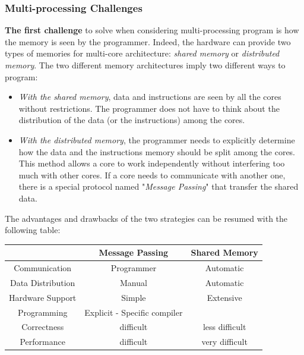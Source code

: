\documentclass[10pt,letterpaper]{article}
\begin{document}
\subsubsection{Multi-processing Challenges}

\textbf{The first challenge} to solve when considering multi-processing program is how the memory is seen by the programmer. Indeed, the hardware can provide two types of memories for multi-core architecture: \textit{shared memory} or \textit{distributed memory}. The two different memory architectures imply two different ways to program:\\
\begin{itemize}
    \item \textit{With the shared memory}, data and instructions are seen by all the cores without restrictions. The programmer does not have to think about the distribution of the data (or the instructions) among the cores.
    \item \textit{With the distributed memory}, the programmer needs to explicitly determine how the data and the instructions memory should be split among the cores. This method allows a core to work independently without interfering too much with other cores. If a core needs to communicate with another one, there is a special protocol named "\textit{Message Passing}" that transfer the shared data.
\end{itemize}

The advantages and drawbacks of the two strategies can be resumed with the following table:

\begin{center}
 \begin{tabular}{||c c c||} 
 \hline
  & Message Passing & Shared Memory \\ [0.5ex] 
 \hline\hline
 Communication & Programmer & Automatic \\ 
 \hline
 Data Distribution & Manual & Automatic \\
\hline
 Hardware Support & Simple & Extensive \\
\hline
 Programming & Explicit - Specific compiler & \\
\hline
 Correctness & difficult & less difficult \\
\hline
 Performance & difficult & very difficult \\
\hline
\end{tabular}
\end{center}

\vspace{0.3cm}
\end{document}
